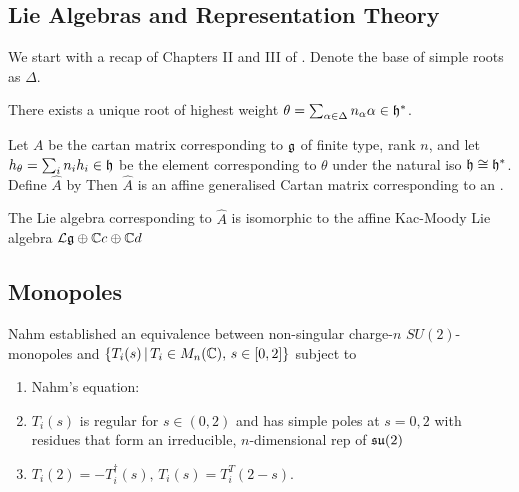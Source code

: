 \documentclass{article}
\begin{document}
\subsection{Lie Algebras and Representation Theory}
We start with a recap of Chapters II and III of \cite{Humphreys1978}. Denote the base of simple roots as $\Delta$. 

\begin{prop}
	There exists a unique root of highest weight $\theta = \sum_{\alpha \in \Delta} n_\alpha \alpha \in \mathfrak{h}^\ast$. 
\end{prop}

\begin{prop}
	Let $A$ be the cartan matrix corresponding to $\mathfrak{g}$ of finite type, rank $n$, and let $h_\theta = \sum_i n_i h_i\in \mathfrak{h}$ be the element corresponding to $\theta$ under the natural iso $\mathfrak{h} \cong \mathfrak{h}^\ast$. Define $\hat{A}$ by 
Then $\hat{A}$ is an affine generalised Cartan matrix corresponding to an .  
\end{prop}

\begin{prop}
	The Lie algebra corresponding to $\hat{A}$ is isomorphic to the affine Kac-Moody Lie algebra $\mathcal{L}\mathfrak{g} \oplus \mathbb{C}c \oplus \mathbb{C}d$
\end{prop}


\subsection{Monopoles}
Nahm established an equivalence between non-singular charge-$n$ $SU(2)$-monopoles and $\left\{ T_i(s) \, | \, T_i \in M_n(\mathbb{C}), \, s \in [0,2] \right\}$ subject to 
\begin{enumerate}
	\item Nahm's equation:
\item $T_i(s)$ is regular for $s \in (0,2)$ and has simple poles at $s=0,2$ with residues that form an irreducible, $n$-dimensional rep of $\mathfrak{su}(2)$
\item $T_i(2) = -T_i^\dagger(s), \, T_i(s) = T^T_i(2-s)$. 
\end{enumerate}
\end{document}
